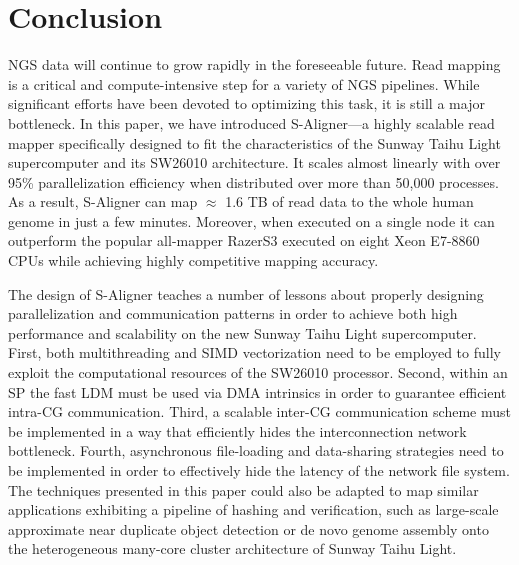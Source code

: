 \section{Conclusion}
\label{Conclusion}

NGS data will continue to grow rapidly in the foreseeable future. Read
mapping is a critical and compute-intensive step for a variety of NGS
pipelines. While significant efforts have been devoted to optimizing
this task, it is still a major bottleneck. In this paper, we have
introduced S-Aligner---a highly scalable read mapper specifically
designed to fit the characteristics of the Sunway Taihu Light
supercomputer and its SW26010 architecture.  It scales almost linearly
with over 95\% parallelization efficiency when distributed over more
than 50,000 processes. As a result, S-Aligner can map $\approx$ 1.6 TB
of read data to the whole human genome in just a few
minutes. Moreover, when executed on a single node it can outperform
the popular all-mapper RazerS3 executed on eight Xeon E7-8860 CPUs
while achieving highly competitive mapping accuracy.

The design of S-Aligner teaches a number of lessons about properly
designing parallelization and communication patterns in order to
achieve both high performance and scalability on the new Sunway Taihu
Light supercomputer. First, both multithreading and SIMD vectorization
need to be employed to fully exploit the computational resources of
the SW26010 processor. Second, within an SP the fast LDM must be used
via DMA intrinsics in order to guarantee efficient intra-CG
communication. Third, a scalable inter-CG communication scheme must be
implemented in a way that efficiently hides the interconnection
network bottleneck. Fourth, asynchronous file-loading and data-sharing
strategies need to be implemented in order to effectively hide the
latency of the network file system. The techniques presented in this
paper could also be adapted to map similar applications exhibiting a
pipeline of hashing and verification, such as large-scale approximate
near duplicate object detection \cite{efficient} or de novo genome
assembly \cite{swap} onto the heterogeneous many-core cluster
architecture of Sunway Taihu Light.
